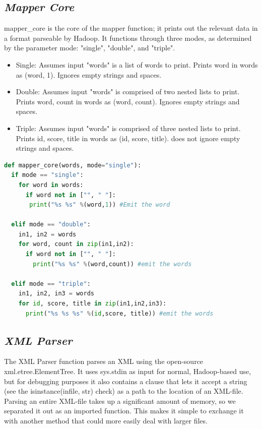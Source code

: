 \documentclass[fleqn,10pt]{wlscirep}
\begin{document}
\subsection{\emph{Mapper Core}}
mapper\_core is the core of the mapper function; it prints out the relevant data in a format parseable by Hadoop. It functions through three modes, as determined by the parameter mode: "single", "double", and "triple".

\begin{itemize}
 \item Single: Assumes input "words" is a list of words to print. Prints word in words as (word, 1). Ignores empty strings and spaces.
 \item Double: Assumes input "words" is comprised of two nested lists to print. Prints word, count in words as (word, count). Ignores empty strings and spaces.
 \item Triple: Assumes input "words" is comprised of three nested lists to print. Prints id, score, title in words as (id, score, title). does not ignore empty strings and spaces.
\end{itemize}

\begin{lstlisting}[language=Python, caption=mapper\_core function]
def mapper_core(words, mode="single"):
  if mode == "single":
    for word in words:
      if word not in ["", " "]:
       print("%s %s" %(word,1)) #Emit the word

  elif mode == "double":
    in1, in2 = words
    for word, count in zip(in1,in2):
      if word not in ["", " "]:
        print("%s %s" %(word,count)) #emit the words

  elif mode == "triple":
    in1, in2, in3 = words
    for id, score, title in zip(in1,in2,in3):
      print("%s %s %s" %(id,score, title)) #emit the words

\end{lstlisting}

\subsection{\emph{XML Parser}}
The XML Parser function parses an XML using the open-source xml.etree.ElementTree. It uses sys.stdin as input for normal, Hadoop-based use, but for debugging purposes it also contains a clause that lets it accept a string (see the isinstance(infile, str) check) as a path to the location of an XML-file.\\
Parsing an entire XML-file takes up a significant amount of memory, so we separated it out as an imported function. This makes it simple to exchange it with another method that could more easily deal with larger files. 
\end{document}
